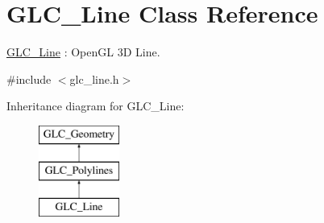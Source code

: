 \hypertarget{class_g_l_c___line}{\section{G\-L\-C\-\_\-\-Line Class Reference}
\label{class_g_l_c___line}
}


\hyperlink{class_g_l_c___line}{G\-L\-C\-\_\-\-Line} \-: Open\-G\-L 3\-D Line.  




{\ttfamily \#include $<$glc\-\_\-line.\-h$>$}

Inheritance diagram for G\-L\-C\-\_\-\-Line\-:\begin{figure}[H]
\begin{center}
\leavevmode
\includegraphics[height=3.000000cm]{class_g_l_c___line}
\end{center}
\end{figure}
